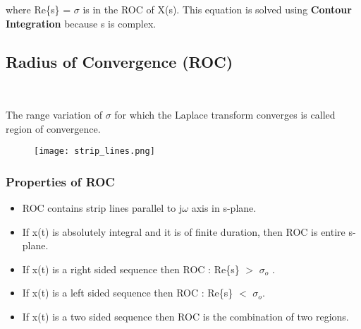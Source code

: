 \documentclass{article}
\begin{document}
\medskip

where Re\{s\} = $\sigma$ is in the ROC of X(s).
This equation is solved using \textbf{Contour Integration} because s is complex. ~\cite{adams2013lecture}

\subsection*{Radius of Convergence (ROC)}~\cite{oppenheim1997signals}

The range variation of $\sigma$ for which the Laplace transform converges is called region of convergence.

\begin{figure}[h]
    \centering
    \texttt{[image: strip\_lines.png]}
    \caption{}
    \label{fig:enter-label}
\end{figure}

\subsubsection*{Properties of ROC}

\begin{itemize}
    \item ROC contains strip lines parallel to j$\omega$ axis in s-plane.
    \item If x(t) is absolutely integral and it is of finite duration, then ROC is entire s-plane.
    \item If x(t) is a right sided sequence then ROC : Re\{s\} $>$ $\sigma_o$ .
    \item If x(t) is a left sided sequence then ROC : Re\{s\} $<$ $\sigma_o$.
    \item If x(t) is a two sided sequence then ROC is the combination of two regions.
\end{itemize}



\end{document}
